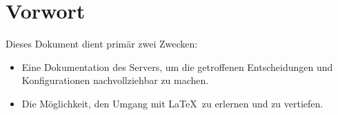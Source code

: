 \chapter*{Vorwort}
Dieses Dokument dient primär zwei Zwecken:
\begin{itemize}
  \item Eine Dokumentation des Servers, um die getroffenen Entscheidungen und Konfigurationen nachvollziehbar zu machen.
  \item Die Möglichkeit, den Umgang mit \LaTeX\ zu erlernen und zu vertiefen.
\end{itemize}
